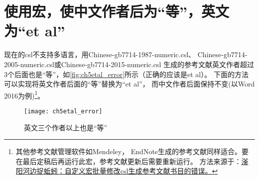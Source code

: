 \documentclass[cn,11pt,chinese]{elegantbook}
\begin{document}
		\section{使用宏，使中文作者后为“等”，英文为“et al”}\label{sec:etal}
			现在的csl不支持多语言，用Chinese-gb7714-1987-numeric.csl、
			Chinese-gb7714-2005-numeric.csl或Chinese-gb7714-2015-numeric.csl
			生成的参考文献英文作者超过3个后面也是“等”，如\autoref{fig:ch5etal_error}所示（正确的应该是et al）。
			下面的方法可以实现将英文作者后面的“等”替换为“et al”，
			而中文作者后面保持不变(以Word 2016为例)\footnote{其他参考文献管理软件如Mendeley，
			EndNote生成的参考文献同样适合。要在最后定稿后再运行此宏，参考文献更新后需要重新运行。
			方法来源于：\href{https://zhuanlan.zhihu.com/p/53594081}
			{滏阳河边捉蚯蚓：自定义宏批量修改csl生成参考文献书目的错误。}}。
			\begin{figure}[htbp]
				\centering
				\texttt{[image: ch5etal\_error]}
				\caption{英文三个作者以上也是“等”}
				\label{fig:ch5etal_error}
			\end{figure}
		
\end{document}
